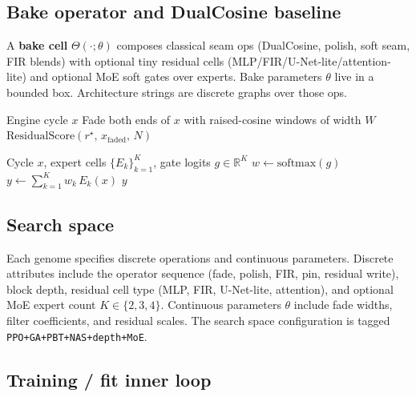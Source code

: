 \subsection{Bake operator and DualCosine baseline}
\label{sec:bake}

A \textbf{bake cell} $\Theta(\cdot;\theta)$ composes classical seam ops (DualCosine, polish, soft seam, FIR blends) with optional tiny residual cells (MLP/FIR/U-Net-lite/attention-lite) and optional MoE soft gates over experts.
Bake parameters $\theta$ live in a bounded box. Architecture strings are discrete graphs over those ops.

\begin{algorithm}[t]
\caption{DualCosine baseline}
\label{alg:dualcosine}
\begin{algorithmic}[1]
\Require Engine cycle $x$
\State Fade both ends of $x$ with raised-cosine windows of width $W$
\State \Return $\mathrm{ResidualScore}(r^{\star},\,x_{\mathrm{faded}},\,N)$
\end{algorithmic}
\end{algorithm}

\begin{algorithm}[t]
\caption{MoE soft gating over bake experts}
\label{alg:moe}
\begin{algorithmic}[1]
\Require Cycle $x$, expert cells $\{E_k\}_{k=1}^{K}$, gate logits $g\in\mathbb{R}^{K}$
\State $w \gets \mathrm{softmax}(g)$
\State $y \gets \sum_{k=1}^{K} w_k\, E_k(x)$
\State \Return $y$
\end{algorithmic}
\end{algorithm}

\subsection{Search space}
\label{sec:search-space}

Each genome specifies discrete operations and continuous parameters.
Discrete attributes include the operator sequence (fade, polish, FIR, pin, residual write), block depth, residual cell type (MLP, FIR, U-Net-lite, attention), and optional MoE expert count $K\in\{2,3,4\}$.
Continuous parameters $\theta$ include fade widths, filter coefficients, and residual scales.
The search space configuration is tagged \texttt{PPO+GA+PBT+NAS+depth+MoE}.

\subsection{Training / fit inner loop}
\label{sec:fit}

